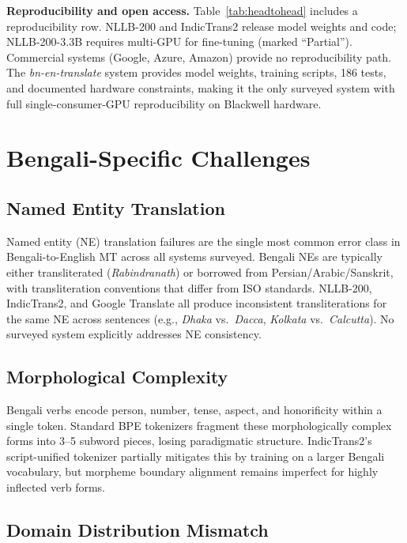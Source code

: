 \documentclass[conference]{IEEEtran}
\begin{document}
\textbf{Reproducibility and open access.}
Table~\ref{tab:headtohead} includes a reproducibility row.
NLLB-200 and IndicTrans2 release model weights and code; NLLB-200-3.3B requires
multi-GPU for fine-tuning (marked ``Partial'').
Commercial systems (Google, Azure, Amazon) provide no reproducibility path.
The \textit{bn-en-translate} system provides model weights, training scripts,
186 tests, and documented hardware constraints, making it the only surveyed
system with full single-consumer-GPU reproducibility on Blackwell hardware.

\section{Bengali-Specific Challenges}
\label{sec:challenges}

\subsection{Named Entity Translation}

Named entity (NE) translation failures are the single most common
error class in Bengali-to-English MT across all systems surveyed.
Bengali NEs are typically either transliterated (\textit{Rabindranath})
or borrowed from Persian/Arabic/Sanskrit, with transliteration conventions
that differ from ISO standards.
NLLB-200, IndicTrans2, and Google Translate all produce inconsistent
transliterations for the same NE across sentences (e.g., \textit{Dhaka}
vs.\ \textit{Dacca}, \textit{Kolkata} vs.\ \textit{Calcutta}).
No surveyed system explicitly addresses NE consistency.

\subsection{Morphological Complexity}

Bengali verbs encode person, number, tense, aspect, and honorificity
within a single token.
Standard BPE tokenizers fragment these morphologically complex forms
into 3--5 subword pieces, losing paradigmatic structure.
IndicTrans2's script-unified tokenizer partially mitigates this by
training on a larger Bengali vocabulary, but morpheme boundary alignment
remains imperfect for highly inflected verb forms.

\subsection{Domain Distribution Mismatch}
\end{document}
